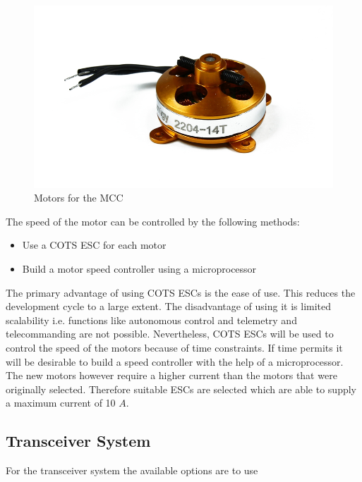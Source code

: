 \begin{figure}[bht]
\centering
\includegraphics[scale=0.25]{figures/Motors.jpg}
\caption[Motors for the MCC]{Motors for the MCC \cite{website:rcflight}}
\label{fig:Motors}
\end{figure}

\noindent
The speed of the motor can be controlled by the following methods:

\begin{itemize}
\item Use a \ac{COTS} \ac{ESC} for each motor
\item Build a motor speed controller using a microprocessor
\end{itemize}

\noindent
The primary advantage of using \ac{COTS} \ac{ESC}s is the ease of use. This reduces the development cycle to a large extent. The disadvantage of using it is limited scalability i.e. functions like autonomous control and telemetry and telecommanding are not possible. Nevertheless, \ac{COTS} \ac{ESC}s will be used to control the speed of the motors because of time constraints. If time permits it will be desirable to build a speed controller with the help of a microprocessor. The new motors however require a higher current than the motors that were originally selected. Therefore suitable \ac{ESC}s are selected which are able to supply a maximum current of 10 $A$.

\subsection{Transceiver System}

For the transceiver system the available options are to use

